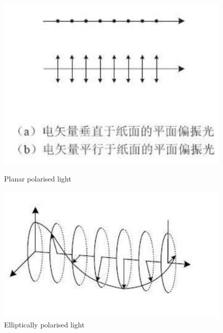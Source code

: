 \documentclass[UTF8]{article}
\begin{document}
		\begin{figure}[H]
		\begin{minipage}[t]{0.5\linewidth}
			\centering
			\includegraphics[clip,scale=1,trim={0 60 0 0}]{figure/fig4.png}
			\caption{Planar polarised light}
			\label{figure.4}
		\end{minipage}
		\begin{minipage}[t]{0.5\linewidth}
			\centering
			\includegraphics[clip,scale=0.8]{figure/fig5.png}
			\caption{Elliptically polarised light}
			\label{figure.5}
		\end{minipage}
	\end{figure}

	
\end{document}
